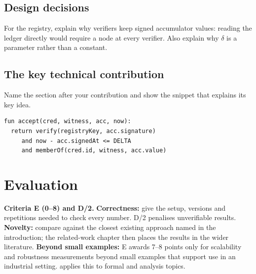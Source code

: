 \subsection{Design decisions}\label{app:chapters:design-decisions}
For the registry, explain why verifiers keep signed accumulator values: reading the ledger directly would require a node at every verifier. Also explain why $\delta$ is a parameter rather than a constant.

\subsection[The key technical contribution]{The key technical contribution\skimmark}\label{app:chapters:key-contribution}
Name the section after your contribution and show the snippet that explains its key idea.
\begin{lstlisting}[caption={The verifier's check: the accumulator value is signed and younger than $\delta$, and the holder's witness shows the credential is still in it.}, label={lst:guide:key}]
fun accept(cred, witness, acc, now):
  return verify(registryKey, acc.signature)
     and now - acc.signedAt <= DELTA
     and memberOf(cred.id, witness, acc.value)
\end{lstlisting}

\section{Evaluation}\label{app:chapters:evaluation}
\textbf{Criteria E (0--8) and D/2.}
\textbf{Correctness:} give the setup, versions and repetitions needed to check every number. D/2 penalises unverifiable results.
\textbf{Novelty:} compare against the closest existing approach named in the introduction; the related-work chapter then places the results in the wider literature.
\textbf{Beyond small examples:} E awards 7--8 points only for scalability and robustness measurements beyond small examples that support use in an industrial setting.  applies this to formal and analysis topics.

